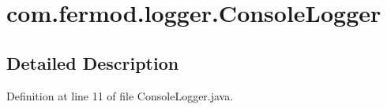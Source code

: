 \hypertarget{classcom_1_1fermod_1_1logger_1_1ConsoleLogger}{}\section{com.\+fermod.\+logger.\+Console\+Logger}
\label{classcom_1_1fermod_1_1logger_1_1ConsoleLogger}


\subsection{Detailed Description}


Definition at line 11 of file Console\+Logger.\+java.

